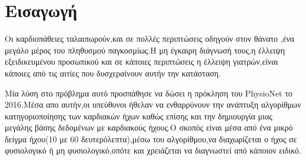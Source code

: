 \section{Εισαγωγή}
Οι καρδιοπάθειες ταλαιπωρούν,και σε πολλές περιπτώσεις οδηγούν στον θάνατο ,ένα
μεγάλο μέρος του πληθυσμού παγκοσμίως.Η μη έγκαιρη διάγνωσή τους,η έλλειψη
εξειδικευμένου προσωπικού και σε κάποιες περιπτώσεις η έλλειψη γιατρών,είναι
κάποιες από τις αιτίες που δυσχεραίνουν αυτήν την κατάσταση.

Μία λύση στο πρόβλημα αυτό προσπάθησε να δώσει η πρόκληση του PhysioNet το
2016.Μέσα απο αυτήν,οι υπεύθυνοι ήθελαν να ενθαρρύνουν την ανάπτυξη αλγορίθμων
κατηγοριοποίησης των καρδιακών ήχων καθώς επίσης και την δημιουργία μιας μεγάλης
βάσης δεδομένων με καρδιακούς ήχους.Ο σκοπός είναι μέσα από ένα μικρό δείγμα
ήχου(10 με 60 δευτερόλεπτα),μέσω του αλγορίθμου,να διαχωρίζεται ο ήχος σε
φυσιολογικό ή μη φυσιολογικό,οπότε και χρειάζεται να διαγνωστεί από κάποιον
ειδικό.
